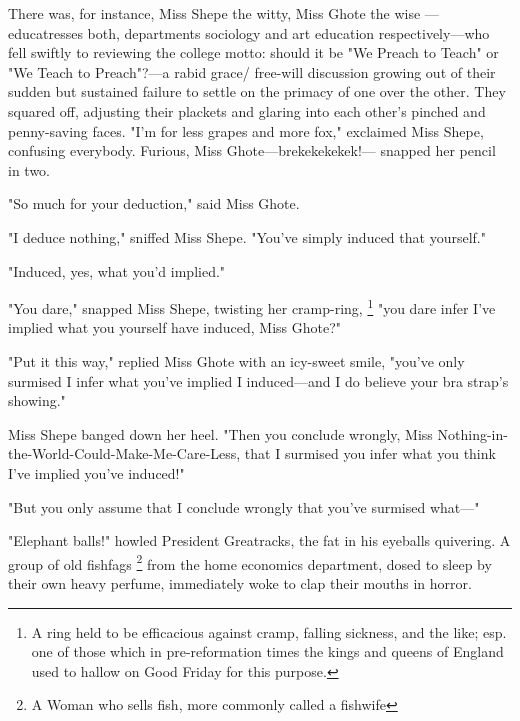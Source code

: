   There was, for instance, Miss Shepe the witty, Miss Ghote the wise
---educatresses both, departments sociology and art education respectively---who
fell swiftly to reviewing the college motto: should it be "We Preach to Teach"
or "We Teach to Preach"?---a rabid 
grace/ free-will discussion growing out of
their sudden but sustained failure to settle on the primacy of one over the
other. They squared off, adjusting their plackets and glaring into each other's
pinched and penny-saving faces. "I'm for less grapes and more fox," exclaimed
Miss Shepe, confusing everybody. Furious, Miss Ghote---brekekekekek!--- snapped 
her pencil in two.

  "So much for your deduction," said Miss Ghote.

  "I deduce nothing," sniffed Miss Shepe. "You've simply induced that yourself."

  "Induced, yes, what you'd implied."

  "You dare," snapped 
Miss Shepe, twisting her cramp-ring, 
\footnote{A ring held to be efficacious against cramp, falling sickness, and the
  like; esp. one of those which in pre-reformation times the kings and queens of
  England used to hallow on Good Friday for this purpose.}
"you dare infer I've implied what you yourself have induced, Miss Ghote?"

  "Put it this way," replied Miss Ghote with an icy-sweet smile, "you've only
surmised 
I infer what you've implied I induced---and I do believe your bra strap's showing."

  Miss Shepe banged down her heel. "Then you conclude wrongly, Miss
Nothing-in-the-World-Could-Make-Me-Care-Less, that I surmised you infer what you
think I've implied you've induced!"

  "But you only assume that I conclude wrongly that you've surmised what---"

  "Elephant balls!" howled President Greatracks, the fat in his eyeballs
quivering. A group of old fishfags 
\footnote{A Woman who sells fish, more commonly called a fishwife}
from the home economics department, dosed 
to sleep by their own heavy perfume, immediately woke to clap their mouths in
horror.


